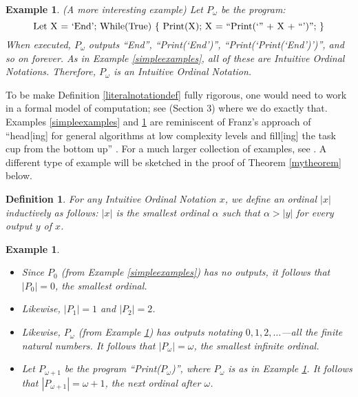 \documentclass[runningheads]{llncs}
\newtheorem{myexample}[mytheorem]{Example}
\newtheorem{mydefinition}[mytheorem]{Definition}
\begin{document}
\begin{myexample}
\label{omegaexample}
(A more interesting example)
    Let $P_\omega$ be the program:
    \[
        \mbox{\normalfont Let X = `End';
        While(True) \{ Print(X); X = ``Print(`'' + X + ``')''; \}}
    \]
    When executed, $P_\omega$ outputs ``End'', ``Print(`End')'',
    ``Print(`Print(`End')')'', and so on forever. As
    in Example \ref{simpleexamples}, all of these are Intuitive Ordinal Notations.
    Therefore, $P_\omega$ is an Intuitive Ordinal Notation.
\end{myexample}

To be make Definition \ref{literalnotationdef} fully rigorous, one would need
to work in a formal model of computation; see \cite{alexander2019measuring} (Section 3)
where we do exactly that.
Examples \ref{simpleexamples} and \ref{omegaexample} are reminiscent
of Franz's approach of ``head[ing] for general algorithms at low complexity levels
and fill[ing] the task cup from the bottom up'' \cite{franz2015toward}.
For a much larger collection of examples, see \cite{github}.
A different type of example will be sketched in the proof of Theorem
\ref{mytheorem} below.

\begin{mydefinition}
    For any Intuitive Ordinal Notation $x$, we define an ordinal $|x|$
    inductively as follows: $|x|$ is the smallest ordinal $\alpha$
    such that $\alpha>|y|$ for every output $y$ of $x$.
\end{mydefinition}

\begin{myexample}
    \begin{itemize}
        \item
        Since $P_0$ (from Example \ref{simpleexamples}) has no outputs,
        it follows that $|P_0|=0$, the smallest ordinal.
        \item
        Likewise, $|P_1|=1$ and $|P_2|=2$.
        \item
        Likewise, $P_\omega$ (from Example \ref{omegaexample}) has outputs
        notating $0, 1, 2, \ldots$---all the finite natural numbers. It follows
        that $|P_\omega|=\omega$, the smallest
        infinite ordinal.
        \item
        Let $P_{\omega+1}$ be the program ``Print($P_\omega$)'',
        where $P_\omega$ is as in Example \ref{omegaexample}.
        It follows that $|P_{\omega+1}|=\omega+1$, the next ordinal after
        $\omega$.
    \end{itemize}
\end{myexample}
\end{document}
